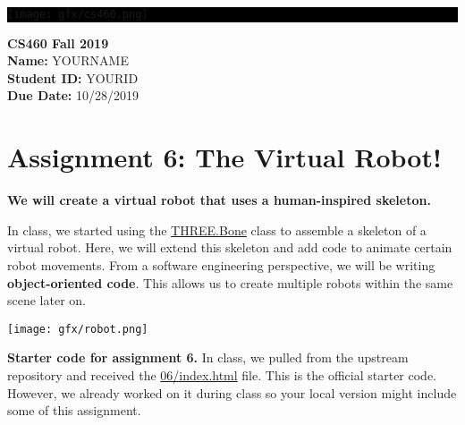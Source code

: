 \documentclass[10pt,oneside,onecolumn,letterpaper]{article}
\begin{document}
\noindent\colorbox{black}{
\begin{minipage}[c]{.99\linewidth}
  \vspace{.4cm}
  \Large{}
  \begin{flushright}
    \vspace{-1.2cm}
    \texttt{[image: gfx/cs460.png]}
  \end{flushright}
\end{minipage}
}


\vspace{.5cm} %

\noindent\textbf{CS460 Fall 2019} \\
\textbf{Name:} YOURNAME \\
\textbf{Student ID:} YOURID \\
\textbf{Due Date:} 10/28/2019

\section*{Assignment 6: The Virtual Robot!}

\textbf{We will create a virtual robot that uses a human-inspired skeleton.}

\vspace{.5cm} %

\noindent In class, we started using the \url{THREE.Bone} class to assemble a skeleton of a virtual robot. Here, we will extend this skeleton and add code to animate certain robot movements. From a software engineering perspective, we will be writing \textbf{object-oriented code}. This allows us to create multiple robots within the same scene later on.

\vspace{.5cm}

\begin{center}
\texttt{[image: gfx/robot.png]}
\end{center}

\vspace{.5cm}

\noindent\textbf{Starter code for assignment 6.} In class, we pulled from the upstream repository and received the \url{06/index.html} file. This is the official starter code. However, we already worked on it during class so your local version might include some of this assignment.
\end{document}
